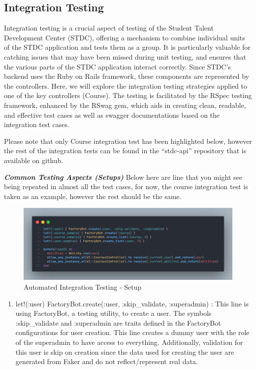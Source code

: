 \vspace{0.25cm}
\subsection{Integration Testing}
\begin{justify}
Integration testing is a crucial aspect of testing of the Student Talent Development Center (STDC), offering a mechanism to combine individual units of the STDC application and tests them as a group. It is particularly valuable for catching issues that may have been missed during unit testing, and ensures that the various parts of the STDC application interact correctly. Since STDC's backend uses the Ruby on Rails framework, these components are represented by the controllers. Here, we will explore the integration testing strategies applied to one of the key controllers (Course). The testing is facilitated by the RSpec testing framework, enhanced by the RSwag gem, which aids in creating clean, readable, and effective test cases as well as swagger documentations based on the integration test cases.

\newendline Please note that only Course integration test has been highlighted below, however the rest of the integration tests can be found in the “stdc-api” repository that is available on github.

\vspace{0.25cm}
\newendline \textbf{\textit{Common Testing Aspects (Setups)}}\newendline
Below here are line that you might see being repeated in almost all the test cases, for now, the course integration test is taken as an example, however the rest should be the same.

\begin{figure}[H]
    \centerline{\includegraphics[width=150mm,scale=1]{figures/implementation_and_testing/testing/AIT/CommonAspects.png}}
    \caption{Automated Integration Testing - Setup}
    \label{Automated Integration Testing - Setup}
\end{figure}

\clearpage
\begin{enumerate}
    \item let!(:user) { FactoryBot.create(:user, :skip\_validate, :superadmin) }: This line is using FactoryBot, a testing utility, to create a user. The symbols :skip\_validate and :superadmin are traits defined in the FactoryBot configurations for user creation. This line creates a dummy user with the role of the superadmin to have access to everything. Additionally, validation for this user is skip on creation since the data used for creating the user are generated from Faker and do not reflect/represent real data.
    \vspace{0.25cm}


\end{enumerate}
\end{justify}
